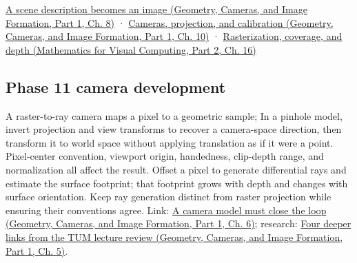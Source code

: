 \href{../03-Geometry-Cameras-and-Image-Formation-P01/main.pdf\#nameddest=03-visual-computing-i-ch001-a-scene-description-becomes-an-image}{A scene description becomes an image (Geometry, Cameras, and Image Formation, Part 1, Ch. 8)} · \href{../03-Geometry-Cameras-and-Image-Formation-P01/main.pdf\#nameddest=03-visual-computing-i-ch003-cameras-projection-and-calibration}{Cameras, projection, and calibration (Geometry, Cameras, and Image Formation, Part 1, Ch. 10)} · \href{../02-Mathematics-for-Visual-Computing-P02/main.pdf\#nameddest=03-visual-computing-i-ch012-rasterization-coverage-and-depth}{Rasterization, coverage, and depth (Mathematics for Visual Computing, Part 2, Ch. 16)}

\subsection{Phase 11 camera development}\label{appendix-1c07d64f5e70-phase-11-camera-development}

\hypertarget{appendix-1c07d64f5e70-phase-11-camera-development}{}

A raster-to-ray camera maps a pixel to a geometric sample; In a pinhole model, invert projection and view transforms to recover a camera-space direction, then transform it to world space without applying translation as if it were a point. Pixel-center convention, viewport origin, handedness, clip-depth range, and normalization all affect the result. Offset a pixel to generate differential rays and estimate the surface footprint; that footprint grows with depth and changes with surface orientation. Keep ray generation distinct from raster projection while ensuring their conventions agree. Link: \href{../03-Geometry-Cameras-and-Image-Formation-P01/main.pdf\#nameddest=02-foundations-ii-ch037-a-camera-model-must-close-the-loop}{A camera model must close the loop (Geometry, Cameras, and Image Formation, Part 1, Ch. 6)}; research: \href{../03-Geometry-Cameras-and-Image-Formation-P01/main.pdf\#nameddest=02-foundations-ii-ch036-four-deeper-links-from-the-tum-lecture-review}{Four deeper links from the TUM lecture review (Geometry, Cameras, and Image Formation, Part 1, Ch. 5)}.
